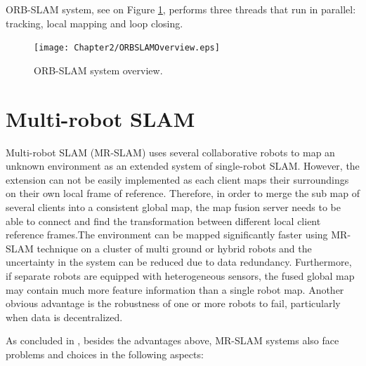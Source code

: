 ORB-SLAM system, see on Figure \ref{fig:orbslamoverview}, performs three threads that run in parallel: tracking, local mapping and loop closing. 


\begin{figure}[H]
	\centering
	\texttt{[image: Chapter2/ORBSLAMOverview.eps]}
	\caption{ORB-SLAM system overview.}
	\label{fig:orbslamoverview} 
\end{figure}

\section{Multi-robot SLAM}

Multi-robot SLAM (MR-SLAM) uses several collaborative robots to map an unknown environment as an extended system of single-robot SLAM. However, the extension can not be easily implemented as each client maps their surroundings on their own local frame of reference. Therefore, in order to merge the sub map of several clients into a consistent global map, the map fusion server needs to be able to connect and find the transformation between different local client reference frames.The environment can be mapped significantly faster using MR-SLAM technique on a cluster of multi ground or hybrid robots and the uncertainty in the system can be reduced due to data redundancy.
Furthermore, if separate robots are equipped with heterogeneous sensors, the fused global map may contain much more feature information than a single robot map. Another obvious advantage is the robustness of one or more robots to fail, particularly when data is decentralized. 

As concluded in \cite{10.1007/978-3-319-78452-6_15}, besides the advantages above, MR-SLAM systems also face problems and choices in the following aspects:

